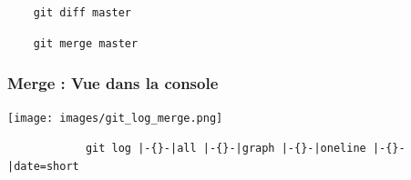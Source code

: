 \documentclass[table,tikz,12pt,svgnames]{beamer}
\begin{document}
\begin{frame}[fragile]

\begin{verbatim}
	git diff master
\end{verbatim}


\pause
\begin{verbatim}
	git merge master
\end{verbatim}
\end{frame}

\begin{frame}[fragile]
\frametitle{Merge : Vue dans la console}
\begin{adjustwidth}{-1cm}{-0.8cm}{}
	\begin{center}
		{\texttt{[image: images/git\_log\_merge.png]}}
		\begin{verbatim}
			git log |-{}-|all |-{}-|graph |-{}-|oneline |-{}-|date=short
		\end{verbatim}
	\end{center}
\end{adjustwidth}
\end{frame}
\end{document}
